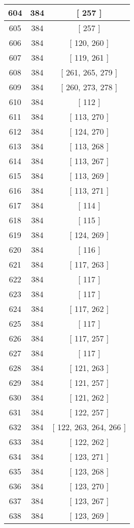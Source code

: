 \begin{center}
\begin{longtable}[H]{|| c c c ||}
\hline
604 & 384 & [ 257 ] \\ 
\hline
605 & 384 & [ 257 ] \\ 
\hline
606 & 384 & [ 120, 260 ] \\ 
\hline
607 & 384 & [ 119, 261 ] \\ 
\hline
608 & 384 & [ 261, 265, 279 ] \\ 
\hline
609 & 384 & [ 260, 273, 278 ] \\ 
\hline
610 & 384 & [ 112 ] \\ 
\hline
611 & 384 & [ 113, 270 ] \\ 
\hline
612 & 384 & [ 124, 270 ] \\ 
\hline
613 & 384 & [ 113, 268 ] \\ 
\hline
614 & 384 & [ 113, 267 ] \\ 
\hline
615 & 384 & [ 113, 269 ] \\ 
\hline
616 & 384 & [ 113, 271 ] \\ 
\hline
617 & 384 & [ 114 ] \\ 
\hline
618 & 384 & [ 115 ] \\ 
\hline
619 & 384 & [ 124, 269 ] \\ 
\hline
620 & 384 & [ 116 ] \\ 
\hline
621 & 384 & [ 117, 263 ] \\ 
\hline
622 & 384 & [ 117 ] \\ 
\hline
623 & 384 & [ 117 ] \\ 
\hline
624 & 384 & [ 117, 262 ] \\ 
\hline
625 & 384 & [ 117 ] \\ 
\hline
626 & 384 & [ 117, 257 ] \\ 
\hline
627 & 384 & [ 117 ] \\ 
\hline
628 & 384 & [ 121, 263 ] \\ 
\hline
629 & 384 & [ 121, 257 ] \\ 
\hline
630 & 384 & [ 121, 262 ] \\ 
\hline
631 & 384 & [ 122, 257 ] \\ 
\hline
632 & 384 & [ 122, 263, 264, 266 ] \\ 
\hline
633 & 384 & [ 122, 262 ] \\ 
\hline
634 & 384 & [ 123, 271 ] \\ 
\hline
635 & 384 & [ 123, 268 ] \\ 
\hline
636 & 384 & [ 123, 270 ] \\ 
\hline
637 & 384 & [ 123, 267 ] \\ 
\hline
638 & 384 & [ 123, 269 ] \\ 

\end{longtable}
\end{center}
